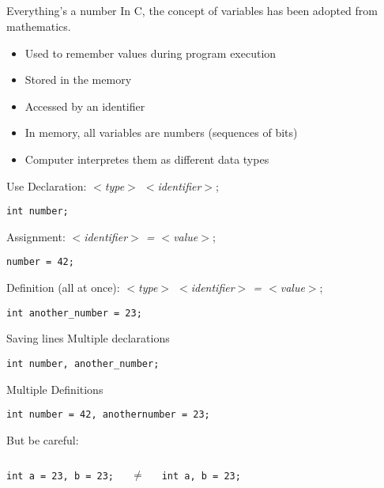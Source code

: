 \subsection{}
\begin{frame}{Everything's a number}
	In C, the concept of variables has been adopted from mathematics.
	\begin{itemize}
		\item Used to remember values during program execution
		\item Stored in the memory
		\item Accessed by an identifier
		\item In memory, all variables are numbers (sequences of bits)
		\item Computer interpretes them as different data types
	\end{itemize}
\end{frame}
\begin{frame}[fragile]{Use}
	Declaration: \textit{$<$type$>$ $<$identifier$>$};
	\begin{lstlisting}[numbers=none,belowskip=-1em]
	int number;
\end{lstlisting}
	Assignment: \textit{$<$identifier$>$ = $<$value$>$};
	\begin{lstlisting}[numbers=none,belowskip=-1em]
	number = 42;
\end{lstlisting}
	Definition (all at once): \textit{$<$type$>$ $<$identifier$>$ = $<$value$>$};
	\begin{lstlisting}[numbers=none]
	int another_number = 23;
\end{lstlisting}
\end{frame}
\begin{frame}[fragile]{Saving lines}
	Multiple declarations
	\begin{lstlisting}[numbers=none,belowskip=-1em]
	int number, another_number;
\end{lstlisting}
	Multiple Definitions
	\begin{lstlisting}[numbers=none, belowskip=0em]
	int number = 42, anothernumber = 23;
\end{lstlisting}
But be careful:
\begin{columns}[c]
	\begin{lstlisting}[numbers=none]
int a = 23, b = 23;
\end{lstlisting}
	\centering
	$\neq$
	\begin{lstlisting}[numbers=none]
int a, b = 23;
\end{lstlisting}
	
\end{columns}
\end{frame}
